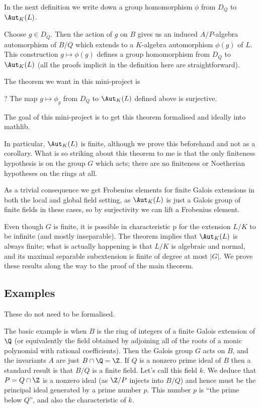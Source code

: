 In the next definition we write down a group homomorphism $\phi$ from $D_Q$ to $\Aut_K(L)$.

\begin{definition}
  \label{Bourbaki52222.stabilizer.toGaloisGroup}
  Choose $g\in D_Q$. Then the action of $g$ on $B$ gives us an induced
  $A/P$-algebra automorphism of $B/Q$ which extends to a $K$-algebra automorphism $\phi(g)$ of $L$.
  This construction $g\mapsto \phi(g)$ defines a group homomorphism from $D_Q$
  to $\Aut_K(L)$ (all the proofs implicit in the definition here are straightforward).
  \leanok
\end{definition}

The theorem we want in this mini-project is
\begin{theorem}
  \label{Ideal.Quotient.stabilizerHom_surjective}?
  \leanok
  The map $g\mapsto \phi_g$ from $D_Q$ to $\Aut_K(L)$ defined above is surjective.
\end{theorem}

The goal of this mini-project is to get this theorem formalised and ideally into mathlib.

In particular, $\Aut_K(L)$ is finite, although we prove this beforehand and not
as a corollary. What is so striking about this theorem to me is that the only finiteness hypothesis
is on the group $G$ which acts; there are no finiteness or Noetherian
hypotheses on the rings at all.

As a trivial consequence we get Frobenius elements for finite Galois extensions in both
the local and global field setting, as $\Aut_K(L)$ is just a Galois group of finite fields
in these cases, so by surjectivity we can lift a Frobenius element.

Even though $G$ is finite, it is possible in characteristic p for the extension $L/K$ to be
infinite (and mostly inseparable). The theorem implies that $\Aut_K(L)$ is always finite;
what is actually happening is that $L/K$ is algebraic and normal, and its maximal separable
subextension is finite of degree at most $|G|$. We prove these results along the way to the
proof of the main theorem.

\subsection{Examples}

These do not need to be formalised.

The basic example is when $B$ is the ring of integers of a finite Galois extension of $\Q$
(or equivalently the field obtained by adjoining all of the roots of
a monic polynomial with rational coefficients).
Then the Galois group $G$ acts on $B$, and the invariants $A$ are just $B\cap\Q=\Z$. If $Q$
is a nonzero prime ideal of $B$ then a standard result is that $B/Q$ is a finite field. Let's
call this field $k$. We deduce that $P=Q\cap \Z$ is a nonzero ideal (as $\Z/P$ injects into $B/Q$)
and hence must be
the principal ideal generated by a prime number $p$. This number $p$ is ``the prime below $Q$'',
and also the characteristic of $k$.

